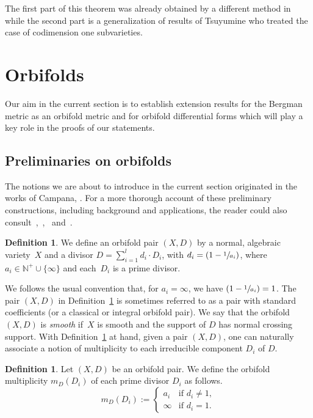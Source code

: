 \documentclass[JEP,XML,SOM,Unicode]{cedram}
\theoremstyle{plain}
\theoremstyle{definition}
\newtheorem{definition}[theorem]{Definition}
\numberwithin{equation}{theorem}
\begin{document}
The first part of this theorem was already obtained by a different method in \cite{RT} while the second part is a generalization of results of Tsuyumine \cite{Tsu86} who treated the case of codimension one subvarieties.

\section{Orbifolds}\label{extension}

Our aim in the current section is to establish extension results for the Bergman metric as an orbifold metric and
for orbifold differential forms which will play a key role in the proofs of our statements.

\subsection{Preliminaries on orbifolds}
The notions we are about to introduce in the current section originated in the
works of Campana, \cf \cite{Cam04}. For a more thorough account of these
preliminary constructions, including background and applications,
the reader could also consult~\cite{MR2860268},~\cite{Taji16},~\cite{CKT16} and~\cite{GT16}.

\begin{definition}\label{def:pair}
We define an orbifold pair $(X,D)$ by a normal, algebraic variety~$X$ and
a divisor $D = \sum_{i=1}^l d_i \cdot D_i$, with $d_i = (1- \sfrac{1}{a_i})$, where
$a_i \in \mathbb N^+ \cup \{ \infty \}$ and each~$D_i$ is a prime divisor.
\end{definition}

We follows the usual convention that, for $a_i = \infty$, we have $(1- \sfrac{1}{a_i}) = 1$. The pair $(X,D)$ in Definition~\ref{def:pair} is sometimes referred to as a pair with standard coefficients
(or a classical or integral orbifold pair). We say that the orbifold $(X,D)$ is \emph{smooth} if~$X$ is smooth and the support of $D$ has normal crossing support. With Definition~\ref{def:pair} at hand, given a pair $(X,D)$, one can naturally associate a notion of multiplicity to each irreducible component $D_i$ of $D$.

\begin{definition}
Let $(X,D)$ be an orbifold pair. We define the orbifold multiplicity $m_{D}(D_i)$ of each
prime divisor $D_i$ as follows.
$$
m_D(D_i) :=
\begin{cases}
a_i & \text{if $d_i\neq 1$}, \\
\infty & \text{if $d_i=1$}.
\end{cases}
$$
\end{definition}
\end{document}
